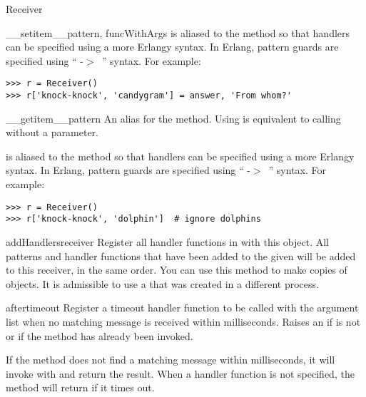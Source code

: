 \documentclass{howto}
\newcommand{\greaterthan}[0]{\begin{math}>\end{math}}
\newcommand{\greaterthan}[0]{>}
\begin{document}
\begin{classdesc}{Receiver}{}
\begin{methoddesc}{__setitem__}{pattern, funcWithArgs}
 is aliased to the  method so that
handlers can be specified using a more Erlangy syntax. In Erlang, pattern guards
are specified using `` -\greaterthan\ '' syntax. For
example:
\begin{verbatim}
>>> r = Receiver()
>>> r['knock-knock', 'candygram'] = answer, 'From whom?'
\end{verbatim}
\end{methoddesc}

\begin{methoddesc}{__getitem__}{pattern}
\opindex{[]}
An alias for the  method. Using  is
equivalent to calling  without a  parameter.

 is aliased to the  method so that
handlers can be specified using a more Erlangy syntax. In Erlang, pattern guards
are specified using `` -\greaterthan\ '' syntax. For
example:
\begin{verbatim}
>>> r = Receiver()
>>> r['knock-knock', 'dolphin']  # ignore dolphins
\end{verbatim}
\end{methoddesc}

\begin{methoddesc}{addHandlers}{receiver}
Register all handler functions in  with this 
object. All patterns and handler functions that have been added to the given
 will be added to this receiver, in the same order. You can use
this method to make copies of  objects. It is admissible to
use a  that was created in a different process.
\end{methoddesc}

\begin{methoddesc}{after}{timeout}
Register a timeout handler function  to be called with the 
argument list when no matching message is received within 
milliseconds. Raises an  if  is not
 or if the  method has already been
invoked.

If the  method does not find a matching message within
 milliseconds, it will invoke  with  and return
the result. When a handler function  is not specified, the
 method will return  if it times out.


\end{methoddesc}
\end{classdesc}
\end{document}
